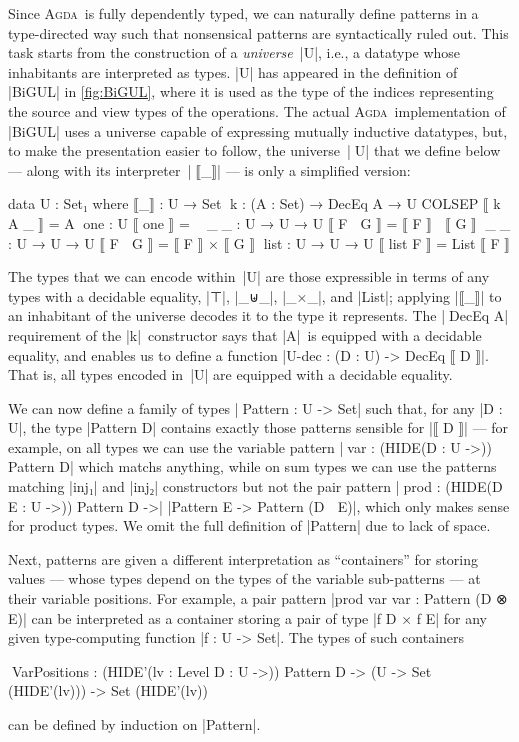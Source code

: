 \documentclass[fleqn]{llncs}
\renewcommand{\emph}{\textsl}
\newcommand{\Agda}{\textsc{Agda}}
\begin{document}
Since \Agda\ is fully dependently typed, we can naturally define patterns in a type-directed way such that nonsensical patterns are syntactically ruled out.
This task starts from the construction of a \emph{universe}~|U|, i.e., a datatype whose inhabitants are interpreted as types.
|U| has appeared in the definition of |BiGUL| in \autoref{fig:BiGUL}, where it is used as the type of the indices representing the source and view types of the operations.
The actual \Agda\ implementation of |BiGUL| uses a universe capable of expressing mutually inductive datatypes, but, to make the presentation easier to follow, the universe~|^^^U| that we define below --- along with its interpreter~|^^^⟦_⟧| --- is only a simplified version:
\begin{code}
data U : Set₁ where                           ⟦_⟧ : U → Set
  ^^^k     : (A : Set) → DecEq A → U  COLSEP  ⟦ k A _   ⟧ = A
  ^^^one   : U                                ⟦ one     ⟧ = ⊤
  ^^^_⊕_   : U → U → U                        ⟦ F ⊕ G   ⟧ = ⟦ F ⟧  ⊎  ⟦ G ⟧
  ^^^_⊗_   : U → U → U                        ⟦ F ⊗ G   ⟧ = ⟦ F ⟧  ×  ⟦ G ⟧
  ^^^list  : U → U → U                        ⟦ list F  ⟧ = List ⟦ F ⟧
\end{code}
The types that we can encode within~|U| are those expressible in terms of any types with a decidable equality, |⊤|, |_⊎_|\kern1pt, |_×_|\kern1pt, and |List|; applying |⟦_⟧| to an inhabitant of the universe decodes it to the type it represents.
The |^^^DecEq A| requirement of the |k|~constructor says that |A|~is equipped with a decidable equality, and enables us to define a function |U-dec : (D : U) -> DecEq ⟦ D ⟧|.
That is, all types encoded in~|U| are equipped with a decidable equality.

We can now define a family of types |^^^Pattern : U -> Set| such that, for any |D : U|, the type |Pattern D| contains exactly those patterns sensible for |⟦ D ⟧| --- for example, on all types we can use the variable pattern |^^^var : (HIDE({D : U} ->)) Pattern D| which matchs anything, while on sum types we can use the patterns matching |inj₁| and |inj₂| constructors but not the pair pattern |^^^prod : (HIDE({D E : U} ->)) Pattern D ->| |Pattern E -> Pattern (D ⊗ E)|, which only makes sense for product types.
We omit the full definition of |Pattern| due to lack of space.

Next, patterns are given a different interpretation as ``containers'' for storing values --- whose types depend on the types of the variable sub-patterns --- at their variable positions.
For example, a pair pattern |prod var var : Pattern (D ⊗ E)| can be interpreted as a container storing a pair of type |f D × f E| for any given type-computing function |f : U -> Set|.
The types of such containers
\begin{code}
^^^VarPositions : (HIDE'({lv : Level} {D : U} ->)) Pattern D -> (U -> Set (HIDE'(lv))) -> Set (HIDE'(lv))
\end{code}
can be defined by induction on |Pattern|.
\end{document}
